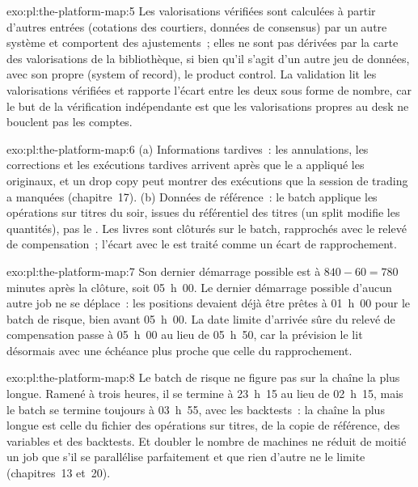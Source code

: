 \begin{solution}{exo:pl:the-platform-map:5}
Les valorisations vérifiées sont calculées à partir d'autres entrées (cotations des courtiers, données de consensus) par un autre système et comportent des ajustements~; elles
ne sont pas dérivées par la carte des valorisations de la bibliothèque, si bien qu'il s'agit d'un autre jeu de données, avec son propre  (system of record), le product
control. La validation lit les valorisations vérifiées et rapporte l'écart entre les deux sous forme de nombre, car le but de
la vérification indépendante est que les valorisations propres au desk ne bouclent pas les comptes.
\end{solution}

\begin{solution}{exo:pl:the-platform-map:6}
(a) Informations tardives~: les annulations, les corrections et les exécutions tardives arrivent après que le  a appliqué les originaux, et un drop copy peut
montrer des exécutions que la session de trading a manquées (chapitre~17). (b) Données de référence~: le batch applique les opérations sur titres du soir, issues du
référentiel des titres (un split modifie les quantités), pas le . Les livres sont clôturés sur le batch, rapprochés avec le
relevé de compensation~; l'écart avec le  est traité comme un écart de rapprochement.
\end{solution}

\begin{solution}{exo:pl:the-platform-map:7}
Son dernier démarrage possible est à $840 - 60 = 780$ minutes après la clôture, soit 05~h~00. Le dernier démarrage possible d'aucun autre job ne se déplace~: les positions devaient
déjà être prêtes à 01~h~00 pour le batch de risque, bien avant 05~h~00. La date limite d'arrivée sûre du relevé de compensation passe à 05~h~00 au lieu de
05~h~50, car la prévision le lit désormais avec une échéance plus proche que celle du rapprochement.
\end{solution}

\begin{solution}{exo:pl:the-platform-map:8}
Le batch de risque ne figure pas sur la chaîne la plus longue. Ramené à trois heures, il se termine à 23~h~15 au lieu de 02~h~15, mais le batch se termine toujours à
03~h~55, avec les backtests~: la chaîne la plus longue est celle du fichier des opérations sur titres, de la copie de référence, des variables et des backtests. Et
doubler le nombre de machines ne réduit de moitié un job que s'il se parallélise parfaitement et que rien d'autre ne le limite (chapitres~13 et~20).
\end{solution}

